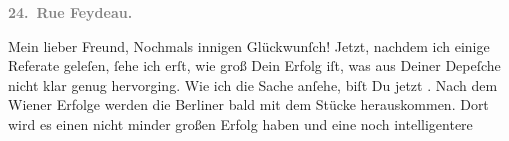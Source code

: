 \begin{ledgroupsized}[t]{13cm}
           \pstart
           \begin{otherlanguage}{french}\textcolor{gray}{\textbf{\textbf{24. Rue Feydeau.}}}\end{otherlanguage}\pend
           \pstart\center{}Mein lieber Freund,\pend\pstart
           Nochmals innigen Glückwunſch!\pend
           \pstart
           Jetzt, nachdem ich einige Referate geleſen, ſehe ich \strikeout{\textcolor{gray}{er}} erſt, wie groß Dein Erfolg iſt, was aus Deiner Depeſche nicht klar genug
               hervorging. Wie ich die Sache anſehe, biſt Du jetzt \label{K_L02751-1v}\label{K_L02751-1h}. Nach dem Wiener Erfolge werden die Berliner bald
               mit dem Stücke herauskommen.
               Dort wird es einen nicht minder großen Erfolg haben und eine noch intelligentere

\end{ledgroupsized}
